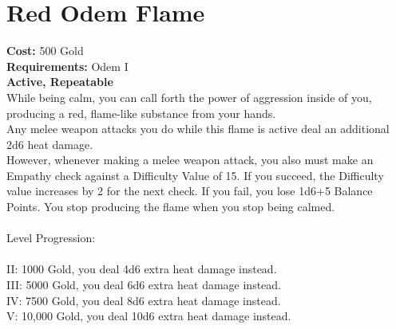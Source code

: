 \section{Red Odem Flame}
\textbf{Cost:} 500 Gold\\
\textbf{Requirements:} Odem I\\
\textbf{Active, Repeatable}\\
While being calm, you can call forth the power of aggression inside of you, producing a red, flame-like substance from your hands.\\
Any melee weapon attacks you do while this flame is active deal an additional 2d6 heat damage.\\
However, whenever making a melee weapon attack, you also must make an Empathy check against a Difficulty Value of 15. If you succeed, the Difficulty value increases by 2 for the next check. If you fail, you lose 1d6+5 Balance Points. You stop producing the flame when you stop being calmed.\\ 
\\
Level Progression:\\
\\
II: 1000 Gold, you deal 4d6 extra heat damage instead.\\
III: 5000 Gold, you deal 6d6 extra heat damage instead.\\
IV: 7500 Gold, you deal 8d6 extra heat damage instead.\\
V: 10,000 Gold, you deal 10d6 extra heat damage instead.\\